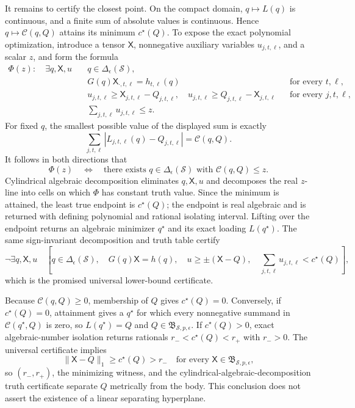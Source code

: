 It remains to certify the closest point.  On the compact domain, \(q\mapsto L(q)\) is continuous, and a finite sum of absolute values is continuous.  Hence \(q\mapsto\mathcal C(q,Q)\) attains its minimum \(c^{\star}(Q)\).  To expose the exact polynomial optimization, introduce a tensor \(\mathsf X\), nonnegative auxiliary variables \(u_{j,t,\ell}\), and a scalar \(z\), and form the formula
\[
\begin{aligned}
 \Phi(z):\quad \exists q,\mathsf X,u\quad
 &q\in\Delta_{\epsilon}(\mathcal S),\\
 &G(q)\mathsf X_{\cdot,t,\ell}=h_{t,\ell}(q)
       &&\text{for every }t,\ell,\\
 &u_{j,t,\ell}\geq \mathsf X_{j,t,\ell}-Q_{j,t,\ell},\quad
  u_{j,t,\ell}\geq Q_{j,t,\ell}-\mathsf X_{j,t,\ell}
       &&\text{for every }j,t,\ell,\\
 &\sum_{j,t,\ell}u_{j,t,\ell}\leq z.
\end{aligned}
\]
For fixed \(q\), the smallest possible value of the displayed sum is exactly
\[
 \sum_{j,t,\ell}|L_{j,t,\ell}(q)-Q_{j,t,\ell}|
 =\mathcal C(q,Q).
\]
It follows in both directions that
\[
 \Phi(z)\quad\Longleftrightarrow\quad
 \text{there exists }q\in\Delta_{\epsilon}(\mathcal S)
 \text{ with }\mathcal C(q,Q)\leq z.
\]
Cylindrical algebraic decomposition eliminates \(q,\mathsf X,u\) and decomposes the real \(z\)-line into cells on which \(\Phi\) has constant truth value.  Since the minimum is attained, the least true endpoint is \(c^{\star}(Q)\); the endpoint is real algebraic and is returned with defining polynomial and rational isolating interval.  Lifting over the endpoint returns an algebraic minimizer \(q^{\star}\) and its exact loading \(L(q^{\star})\).  The same sign-invariant decomposition and truth table certify
\[
 \neg\exists q,\mathsf X,u\quad
 \left[
  q\in\Delta_{\epsilon}(\mathcal S),\quad
  G(q)\mathsf X=h(q),\quad
  u\geq\pm(\mathsf X-Q),\quad
  \sum_{j,t,\ell}u_{j,t,\ell}<c^{\star}(Q)
 \right],
\]
which is the promised universal lower-bound certificate.

Because \(\mathcal C(q,Q)\geq0\), membership of \(Q\) gives \(c^{\star}(Q)=0\).  Conversely, if \(c^{\star}(Q)=0\), attainment gives a \(q^{\star}\) for which every nonnegative summand in \(\mathcal C(q^{\star},Q)\) is zero, so \(L(q^{\star})=Q\) and \(Q\in\mathfrak B_{\mathcal S,p,\epsilon}\).  If \(c^{\star}(Q)>0\), exact algebraic-number isolation returns rationals \(r_-<c^{\star}(Q)<r_+\) with \(r_->0\).  The universal certificate implies
\[
 \lVert \mathsf X-Q\rVert_1\geq c^{\star}(Q)>r_-
 \quad\text{for every }\mathsf X\in\mathfrak B_{\mathcal S,p,\epsilon},
\]
so \((r_-,r_+)\), the minimizing witness, and the cylindrical-algebraic-decomposition truth certificate separate \(Q\) metrically from the body.  This conclusion does not assert the existence of a linear separating hyperplane.

